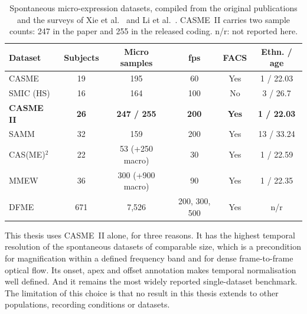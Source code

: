 \begin{table}[htbp]
	\centering
	\footnotesize
	\setlength{\tabcolsep}{4pt}
	\begin{tabular}{l c c c c c}
		\hline
		\textbf{Dataset} & \textbf{Subjects} & \textbf{Micro samples} & \textbf{fps} & \textbf{FACS} & \textbf{Ethn. / age} \\
		\hline
		CASME~\cite{yan2013casme}          & 19                & 195                & 60              & Yes          & 1 / 22.03 \\
		SMIC (HS)~\cite{liX2013}           & 16                & 164                & 100             & No           & 3 / 26.7 \\
		\textbf{CASME II}~\cite{yan2014}   & \textbf{26}       & \textbf{247 / 255} & \textbf{200}    & \textbf{Yes} & \textbf{1 / 22.03} \\
		SAMM~\cite{davison2018}            & 32                & 159                & 200             & Yes          & 13 / 33.24 \\
		CAS(ME)$^2$~\cite{qu2016}          & 22                & 53 (+250 macro)    & 30              & Yes          & 1 / 22.59 \\
		MMEW~\cite{ben2021}                & 36                & 300 (+900 macro)   & 90              & Yes          & 1 / 22.35 \\
		DFME~\cite{zhao2024dfme}           & 671               & 7,526              & 200, 300, 500   & Yes          & n/r \\
		\hline
	\end{tabular}
	\caption[Spontaneous micro-expression datasets]{Spontaneous micro-expression datasets, compiled from the original publications and the surveys of Xie et al.~\cite{xie2022} and Li et al.~\cite{li2022survey}. CASME~II carries two sample counts: 247 in the paper and 255 in the released coding. n/r: not reported here.}
	\label{tab:spontaneous-corpora}
\end{table}

This thesis uses CASME~II alone, for three reasons. It has the highest temporal resolution of the spontaneous datasets of comparable size, which is a precondition for magnification within a defined frequency band and for dense frame-to-frame optical flow. Its onset, apex and offset annotation makes temporal normalisation well defined. And it remains the most widely reported single-dataset benchmark. The limitation of this choice is that no result in this thesis extends to other populations, recording conditions or datasets.

